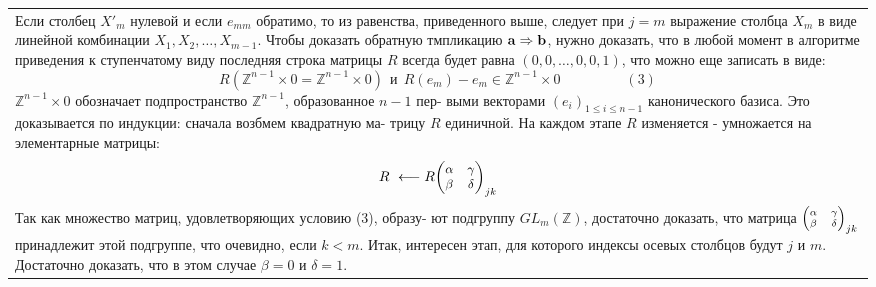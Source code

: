 \documentclass{mai_book}
\begin{document}
	\pagebreak
	
	
	\begin{tabular}{|p{12.5cm}}
	\noindent
	Если столбец $X'_m$ нулевой и если $e_{mm}$ обратимо, то из равенства,\linebreak
	приведенного выше, следует при $j = m$ выражение столбца $X_m$ в\linebreak
	виде линейной комбинации $X_1, X_2, \ldots, X_{m - 1}$.\linebreak
	Чтобы доказать обратную тмпликацию ${\bf a \Rightarrow b}$, нужно доказать,\linebreak
	что в любой момент в алгоритме приведения к ступенчатому виду\linebreak
	последняя строка матрицы $R$ всегда будет равна $(0, 0, \ldots, 0, 0, 1)$,\linebreak
	что можно еще записать в виде:
	$$R({\mathbb Z}^{n - 1}\times 0 = {\mathbb Z}^{n - 1}\times 0) \ \  \text{и} \ \ R(e_m) - e_m \in {\mathbb Z}^{n - 1}\times 0 \ \ \ \ \ \ \ \ \ \ \ \ \ \ \ \ \ \ \ \ \ (3)$$
	${\mathbb Z}^{n - 1}\times 0$ обозначает подпространство ${\mathbb Z}^{n - 1}$, образованное $n - 1$ пер-\linebreak
	выми векторами $(e_i)_{1 \leqslant i \leqslant n - 1}$ канонического базиса.\newline
	Это доказывается по индукции: сначала возбмем квадратную ма-\linebreak
	трицу $R$ единичной. На каждом этапе $R$ изменяется - умножается\linebreak
	на элементарные матрицы:
	$$R \ \longleftarrow R{\small \begin{pmatrix} \alpha & \gamma\\ \beta & \delta \end{pmatrix}_{jk}}$$
	Так как множество матриц, удовлетворяющих условию (3), образу-\linebreak
	ют подгруппу $GL_m(\mathbb Z)$, достаточно доказать, что матрица ${\scriptsize \begin{pmatrix} \alpha & \gamma\\ \beta & \delta \end{pmatrix}_{jk}}$\linebreak
	принадлежит этой подгруппе, что очевидно, если $k < m$.\linebreak
	Итак, интересен этап, для которого индексы осевых столбцов будут\linebreak
	$j$ и $m$. Достаточно доказать, что в этом случае $\beta = 0$ и $\delta = 1$.\linebreak

\end{tabular}
\end{document}

